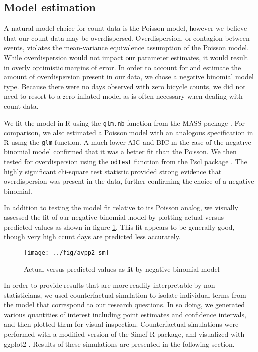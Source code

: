 \documentclass[12pt,letterpaper,article]{memoir} %
\begin{document}
\subsection*{Model estimation}
A natural model choice for count data is the Poisson model, however we
believe that our count data may be overdispersed. Overdispersion, or
contagion between events, violates the mean-variance equivalence
assumption of the Poisson model. While overdispersion would not impact
our parameter estimates, it would result in overly optimistic margins
of error. In order to account for and estimate the amount of
overdispersion present in our data, we chose a negative binomial model
type. Because there were no days observed with zero bicycle counts, we
did not need to resort to a zero-inflated model as is often necessary
when dealing with count data.

We fit the model in R using the \texttt{glm.nb} function from the MASS
package \parencite{Venables:2002aa}. For comparison, we also estimated a
Poisson model with an analogous specification in R using the
\texttt{glm} function. A much lower AIC and BIC in the case of the
negative binomial model confirmed that it was a better fit than the
Poisson. We then tested for overdispersion using the \texttt{odTest} function
from the Pscl package \parencite{Jackman:2014aa}. The highly significant
chi-square test statistic provided strong evidence that overdispersion
was present in the data, further confirming the choice of a negative
binomial.

In addition to testing the model fit relative to its Poisson
analog, we visually assessed the fit of our negative binomial model by
plotting actual versus predicted values as shown in figure
\ref{fg:avp}. This fit appears to be generally good, though very high
count days are predicted less accurately.

\begin{figure}[h!]
  \centering
  \texttt{[image: ../fig/avpp2-sm]}
  \caption{Actual versus predicted values as fit by negative binomial model}
  \label{fg:avp}
\end{figure}

In order to provide results that are more readily interpretable by
non-statisticians, we used counterfactual simulation to isolate
individual terms from the model that correspond to our research
questions. In so doing, we generated various quantities of interest
including point estimates and confidence intervals, and then plotted
them for visual inspection. Counterfactual simulations were performed
with a modified version of the Simcf R package, and visualized with
ggplot2 \parencite{Adolph:2014aa,Schmiedeskamp:aa,Wickham:2009aa}.
Results of these simulations are presented in the following section.
\end{document}
